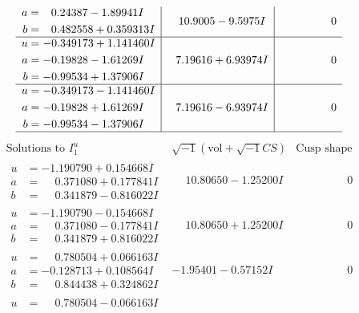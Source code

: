 \documentclass[1p]{elsarticle_modified}
\theoremstyle{definition}
\newcommand{\I}{\sqrt{-1}}
\begin{document}
$$\begin{array}{c|c|c}
\begin{aligned}
a &= \phantom{-}0.24387 - 1.89941 I \\
b &= \phantom{-}0.482558 + 0.359313 I\end{aligned}
 & \phantom{-}10.9005 - 9.5975 I & \phantom{-0.000000 } 0 \\ \hline\begin{aligned}
u &= -0.349173 + 1.141460 I \\
a &= -0.19828 - 1.61269 I \\
b &= -0.99534 + 1.37906 I\end{aligned}
 & \phantom{-}7.19616 + 6.93974 I & \phantom{-0.000000 } 0 \\ \hline\begin{aligned}
u &= -0.349173 - 1.141460 I \\
a &= -0.19828 + 1.61269 I \\
b &= -0.99534 - 1.37906 I\end{aligned}
 & \phantom{-}7.19616 - 6.93974 I & \phantom{-0.000000 } 0\\
 \hline 
 \end{array}$$\newpage$$\begin{array}{c|c|c}  
\text{Solutions to }I^u_{1}& \I (\text{vol} + \sqrt{-1}CS) & \text{Cusp shape}\\
 \hline 
\begin{aligned}
u &= -1.190790 + 0.154668 I \\
a &= \phantom{-}0.371080 + 0.177841 I \\
b &= \phantom{-}0.341879 - 0.816022 I\end{aligned}
 & \phantom{-}10.80650 - 1.25200 I & \phantom{-0.000000 } 0 \\ \hline\begin{aligned}
u &= -1.190790 - 0.154668 I \\
a &= \phantom{-}0.371080 - 0.177841 I \\
b &= \phantom{-}0.341879 + 0.816022 I\end{aligned}
 & \phantom{-}10.80650 + 1.25200 I & \phantom{-0.000000 } 0 \\ \hline\begin{aligned}
u &= \phantom{-}0.780504 + 0.066163 I \\
a &= -0.128713 + 0.108564 I \\
b &= \phantom{-}0.844438 + 0.324862 I\end{aligned}
 & -1.95401 - 0.57152 I & \phantom{-0.000000 } 0 \\ \hline\begin{aligned}
u &= \phantom{-}0.780504 - 0.066163 I \\

\end{aligned}
\end{array}$$
\end{document}
